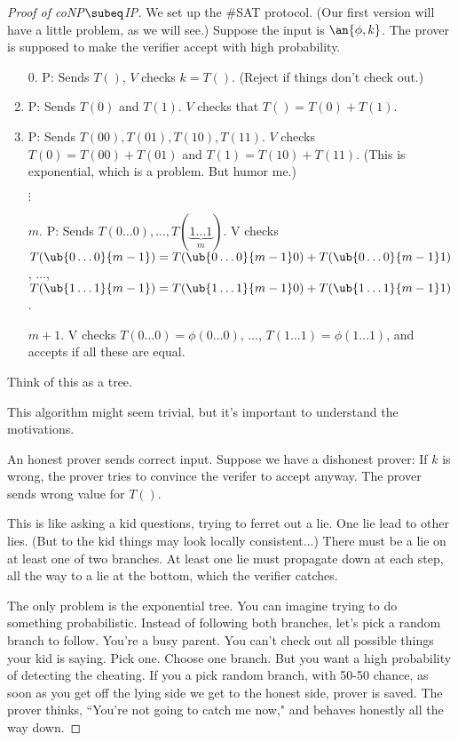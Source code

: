 \begin{proof}[Proof of coNP$\subeq$IP]
We set up the $\#$SAT protocol. (Our first version will have a little problem, as we will see.)
Suppose the input is $\an{\phi,k}$. The prover is supposed to make the verifier accept with high probability. %
\begin{enumerate}
\item[0.] P: Sends $T()$, $V$ checks $k=T()$.
(Reject if things don't check out.)
\item 
P: Sends $T(0)$ and $T(1)$. %
$V$ checks that $T()=T(0)+T(1)$.
\item
P: Sends $T(00),T(01),T(10),T(11)$. $V$ checks $T(0)=T(00)+T(01)$ and $T(1)=T(10)+T(11)$. (This is exponential, which is a problem. But humor me.)

$\vdots$

\item[$m$.] P: Sends $T(0\ldots 0),\ldots, T(\underbrace{1\ldots 1}_{m})$. V checks $T(\ub{0\ldots 0}{m-1})=T(\ub{0\ldots 0}{m-1}0)+T(\ub{0\ldots 0}{m-1}1)$, $\ldots$, $T(\ub{1\ldots 1}{m-1})=T(\ub{1\ldots 1}{m-1}0)+T(\ub{1\ldots 1}{m-1}1)$.
\item[$m+1$.] V checks $T(0\ldots 0)=\phi(0\ldots 0)$, $\ldots$, $T(1\ldots 1)=\phi(1\ldots1)$, and accepts if all these are equal.
\end{enumerate}
Think of this as a tree. 


This algorithm might seem trivial, but it's important to understand the motivations.

An honest prover sends correct input. Suppose we have a dishonest prover: If $k$ is wrong, the prover tries to convince the verifer to
 accept anyway. The prover sends wrong value for $T()$. %

This is like asking a kid questions, trying to ferret out a lie. One lie lead to other lies. (But to the kid things may look locally consistent...) There must be a lie on at least one of two branches. At least one lie must propagate down at each step, 
all the way to a lie at the bottom, which the verifier catches.

The only problem is the exponential tree. You can imagine trying to do something probabilistic. Instead of following both branches, let's pick a random branch to follow. You're a busy parent. You can't check out all possible things your kid is saying. Pick one. Choose one branch. But you want a high probability of detecting the cheating. If you a pick random branch, with 50-50 chance, as soon as you get off the lying side we get to the honest side, prover is saved. The prover thinks, ``You're not going to catch me now," and behaves honestly all the way down.


\end{proof}
